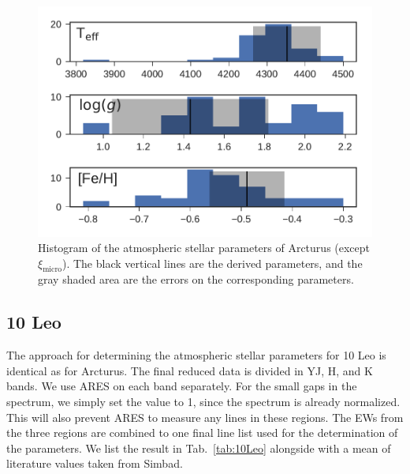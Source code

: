\documentclass{aa}
\begin{document}
\begin{figure}[tpb]
    \centering
    \includegraphics[width=1.0\linewidth]{figures/ArcturusParams.pdf}
    \caption{Histogram of the atmospheric stellar parameters of Arcturus (except
             $\xi_\mathrm{micro}$). The black vertical lines are the derived
             parameters, and the gray shaded area are the errors on the
             corresponding parameters.}
    \label{fig:arcturus}
\end{figure}



\subsection{10 Leo}
\label{sec:10Leo}

The approach for determining the atmospheric stellar parameters for 10 Leo is
identical as for Arcturus. The final reduced data is divided in YJ, H, and K
bands. We use ARES on each band separately. For the small gaps in the spectrum,
we simply set the value to 1, since the spectrum is already normalized. This
will also prevent ARES to measure any lines in these regions. The EWs from the
three regions are combined to one final line list used for the determination of
the parameters. We list the result in Tab.~\ref{tab:10Leo} alongside with a mean
of literature values taken from Simbad.
\end{document}
